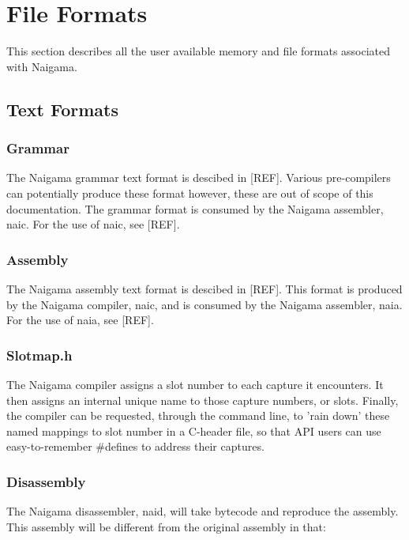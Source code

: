 \section{File Formats}

This section describes all the user available memory and file formats
associated with Naigama.

\subsection{Text Formats}

\subsubsection{Grammar}

The Naigama grammar text format is descibed in [REF].
Various pre-compilers can potentially produce these format however,
these are out of scope of this documentation. The grammar format is
consumed by the Naigama assembler, naic. For the use of naic, see [REF].

\subsubsection{Assembly}

The Naigama assembly text format is descibed in [REF].
This format is produced by the Naigama compiler, naic,
and is consumed by the Naigama assembler, naia.
For the use of naia, see [REF].

\subsubsection{Slotmap.h}

The Naigama compiler assigns a slot number to each capture it encounters.
It then assigns an internal unique name to those capture numbers, or slots.
Finally, the compiler can be requested, through the command line, to
'rain down' these named mappings to slot number in a C-header file, so that
API users can use easy-to-remember #defines to address their captures.

\subsubsection{Disassembly}

The Naigama disassembler, naid, will take bytecode and reproduce the
assembly. This assembly will be different from the original assembly
in that:

